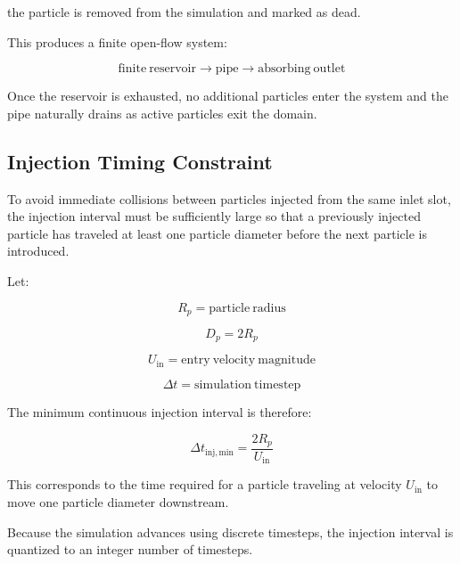\documentclass[11pt]{article}
\begin{document}
the particle is removed from the simulation and marked as dead.

This produces a finite open-flow system:

\begin{equation}
\mathrm{finite\ reservoir}
\rightarrow
\mathrm{pipe}
\rightarrow
\mathrm{absorbing\ outlet}
\end{equation}

Once the reservoir is exhausted, no additional particles enter the system and the pipe naturally drains as active particles exit the domain.

\subsection{Injection Timing Constraint}

To avoid immediate collisions between particles injected from the same inlet slot, the injection interval must be sufficiently large so that a previously injected particle has traveled at least one particle diameter before the next particle is introduced.

Let:

\begin{equation}
R_p = \mathrm{particle\ radius}
\end{equation}

\begin{equation}
D_p = 2R_p
\end{equation}

\begin{equation}
U_{\mathrm{in}} = \mathrm{entry\ velocity\ magnitude}
\end{equation}

\begin{equation}
\Delta t = \mathrm{simulation\ timestep}
\end{equation}

The minimum continuous injection interval is therefore:

\begin{equation}
\Delta t_{\mathrm{inj,min}}
=
\frac{2R_p}{U_{\mathrm{in}}}
\end{equation}

This corresponds to the time required for a particle traveling at velocity $U_{\mathrm{in}}$ to move one particle diameter downstream.

Because the simulation advances using discrete timesteps, the injection interval is quantized to an integer number of timesteps.
\end{document}

